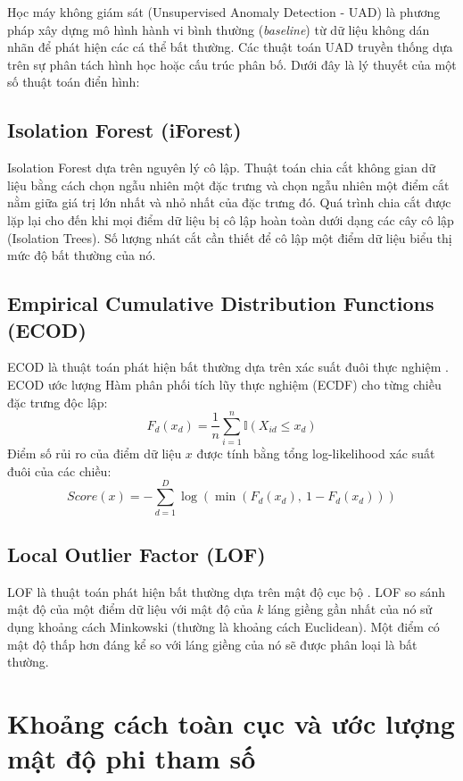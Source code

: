 \documentclass[../main.tex]{subfiles}
\begin{document}
Học máy không giám sát (Unsupervised Anomaly Detection - UAD) là phương pháp xây dựng mô hình hành vi bình thường (\textit{baseline}) từ dữ liệu không dán nhãn để phát hiện các cá thể bất thường. Các thuật toán UAD truyền thống dựa trên sự phân tách hình học hoặc cấu trúc phân bố. Dưới đây là lý thuyết của một số thuật toán điển hình:

\subsection{Isolation Forest (iForest)}
Isolation Forest \cite{liu2008isolation} dựa trên nguyên lý cô lập. Thuật toán chia cắt không gian dữ liệu bằng cách chọn ngẫu nhiên một đặc trưng và chọn ngẫu nhiên một điểm cắt nằm giữa giá trị lớn nhất và nhỏ nhất của đặc trưng đó. Quá trình chia cắt được lặp lại cho đến khi mọi điểm dữ liệu bị cô lập hoàn toàn dưới dạng các cây cô lập (Isolation Trees). Số lượng nhát cắt cần thiết để cô lập một điểm dữ liệu biểu thị mức độ bất thường của nó.

\subsection{Empirical Cumulative Distribution Functions (ECOD)}
ECOD là thuật toán phát hiện bất thường dựa trên xác suất đuôi thực nghiệm \cite{li2023ecod}. ECOD ước lượng Hàm phân phối tích lũy thực nghiệm (ECDF) cho từng chiều đặc trưng độc lập:
\begin{equation}
    F_{d}(x_d) = \frac{1}{n} \sum_{i=1}^{n} \mathbb{I}(X_{id} \le x_d)
\end{equation}
Điểm số rủi ro của điểm dữ liệu $x$ được tính bằng tổng log-likelihood xác suất đuôi của các chiều:
\begin{equation}
    Score(x) = -\sum_{d=1}^{D} \log\left( \min(F_{d}(x_d),\ 1 - F_{d}(x_d)) \right)
\end{equation}

\subsection{Local Outlier Factor (LOF)}
LOF là thuật toán phát hiện bất thường dựa trên mật độ cục bộ \cite{breunig2000lof}. LOF so sánh mật độ của một điểm dữ liệu với mật độ của $k$ láng giềng gần nhất của nó sử dụng khoảng cách Minkowski (thường là khoảng cách Euclidean). Một điểm có mật độ thấp hơn đáng kể so với láng giềng của nó sẽ được phân loại là bất thường.

\section{Khoảng cách toàn cục và ước lượng mật độ phi tham số}
\label{section:1.6}
\end{document}

